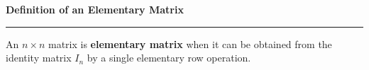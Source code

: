 \nopagenumbers
{\bf Definition of an Elementary Matrix}
\vskip 1mm
\hrule

\vskip 6pt
An $n\times n$ matrix is {\bf elementary matrix} when it can be obtained from the identity matrix $I_n$ by a single elementary row operation.
\vfill\eject
\bye
